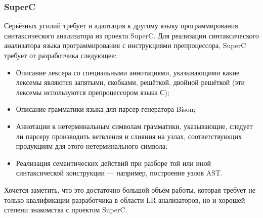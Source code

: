 \subsubsection{SuperC}

Серьёзных усилий требует и адаптация к другому языку программирования синтаксического анализатора из проекта SuperC. Для реализации синтаксического анализатора языка программирования с инструкциями препроцессора, SuperC требует от разработчика следующее:

\begin{itemize}
\item Описание лексера со специальными аннотациями, указывающими какие лексемы являются запятыми, скобками, решёткой, двойной решёткой (эти лексемы используются препроцессором языка С);
\item Описание грамматики языка для парсер-генератора Bison;
\item Аннотации к нетерминальным символам грамматики, указывающие, следует ли парсеру производить ветвления и слияния на узлах, соответствующих продукциям для этого нетерминального символа;
\item Реализация семантических действий при разборе той или иной синтаксической конструкции --- например, построение узлов AST.
\end{itemize}

Хочется заметить, что это достаточно большой объём работы, которая требует не только квалификации разработчика в области LR анализаторов, но и хорошей степени знакомства с проектом SuperC.
